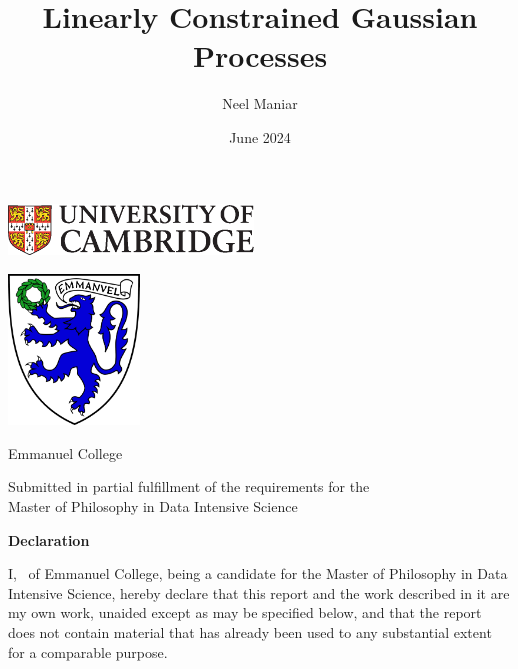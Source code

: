 \documentclass[12pt,a4paper,twoside]{report}
\title{Linearly Constrained Gaussian Processes}
\author{Neel Maniar}
\date{June 2024}
\newcommand{\college}{Emmanuel College}
\newcommand{\course}{Master of Philosophy in Data Intensive Science}
\theoremstyle{definition}
\begin{document}
\begin{titlepage}
\makeatletter

\hspace*{-14mm}\includegraphics[width=65mm]{CUni}

\begin{center}
\Huge
\vspace{\fill}

\@title
\vspace{\fill}

\@author
\vspace{10mm}

\includegraphics[width=35mm]{Emmanuel}

\Large
\college
\vspace{\fill}

\@date
\vspace{\fill}

\end{center}

\vspace{\fill}
\begin{center}
Submitted in partial fulfillment of the requirements for the\\
\course
\end{center}
\end{titlepage}

\textbf{\Huge Declaration}
\vspace{40pt}

I, \@author\ of \college, being a candidate for the \course, hereby
declare that this report and the work described in it are my own work,
unaided except as may be specified below, and that the report does not
contain material that has already been used to any substantial extent
for a comparable purpose.

\end{document}
